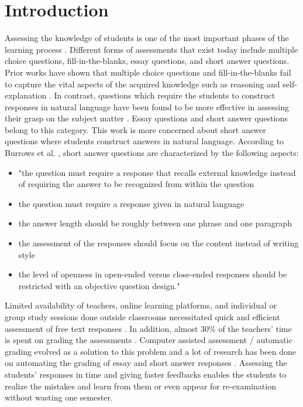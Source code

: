 

\chapter{Introduction}

Assessing the knowledge of students is one of the most important phases of the learning process \cite{Mohler2011}. Different forms of assessments that exist today include multiple choice questions, fill-in-the-blanks, essay questions, and short answer questions. Prior works have shown that multiple choice questions and fill-in-the-blanks fail to capture the vital aspects of the acquired knowledge such as reasoning and self-explanation \cite{Wang2008}. In contrast, questions which require the students to construct responses in natural language have been found to be more effective in assessing their grasp on the subject matter \cite{Roy2016a}. Essay questions and short answer questions belong to this category. This work is more concerned about short answer questions where students construct answers in natural language. According to Burrows et al. \cite{Burrows2015}, short answer questions are characterized by the following aspects:

\begin{itemize}
	
	\item "the question must require a response that recalls external knowledge instead of requiring the answer to be recognized from within the question
	
	\item the question must require a response given in natural language
	
	\item the answer length should be roughly between one phrase and one paragraph
	
	\item the assessment of the responses should focus on the content instead of writing style
	
	\item the level of openness in open-ended versus close-ended responses should be restricted with an objective question design."
	
\end{itemize}

Limited availability of teachers, online learning platforms, and individual or group study sessions done outside classrooms necessitated quick and efficient assessment of free text responses \cite{Mohler2011}. In addition, almost 30\% of the teachers' time is spent on grading the assessments \cite{mason2002}. Computer assisted assessment / automatic grading evolved as a solution to this problem and a lot of research has been done on automating the grading of essay \cite{Higgins2004} and short answer responses \cite{Leacock2003, Pulman2005, Mohler2009}. Assessing the students' responses in time and giving faster feedbacks enables the students to realize the mistakes and learn from them or even appear for re-examination without wasting one semester.

